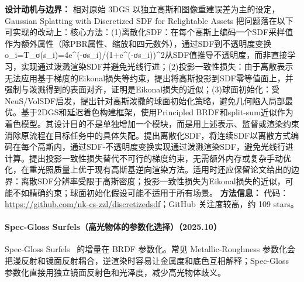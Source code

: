 \textbf{设计动机与边界：} 相对原始 3DGS 以独立高斯和图像重建误差为主的设定，Gaussian Splatting with Discretized SDF for Relightable Assets 把问题落在以下可实现的改动上：核心方法：(1)离散化SDF：在每个高斯上编码一个SDF采样值作为额外属性（除PBR属性、缩放和四元数外），通过SDF到不透明度变换o\_i=T\_σ(s\_i)=4e\^{}(-σs\_i)/(1+e\^{}(-σs\_i))\^{}2从SDF值推导不透明度，而非直接学习，实现通过泼溅渲染SDF并避免光线行进；(2)投影一致性损失：由于离散表示无法应用基于梯度的Eikonal损失等约束，提出将高斯投影到SDF零等值面上，并强制与泼溅得到的表面对齐，证明是Eikonal损失的近似；(3)球面初始化：受NeuS/VolSDF启发，提出针对高斯泼撒的球面初始化策略，避免几何陷入局部最优。基于2DGS和延迟着色构建框架，使用Principled BRDF和split-sum近似作为着色模型。其设计目的不是单独增加一个模块，而是用上述表示、监督或渲染约束消除原流程在目标任务中的具体失配。提出离散化SDF，将连续SDF以离散方式编码在每个高斯内，通过SDF-不透明度变换实现通过泼溅渲染SDF，避免光线行进计算。提出投影一致性损失替代不可行的梯度约束，无需额外内存或复杂手动优化，在重光照质量上优于现有高斯基逆向渲染方法。适用时还应保留论文给出的边界：离散SDF分辨率受限于高斯密度；投影一致性损失为Eikonal损失的近似，可能不如精确约束；球面初始化假设可能不适用于所有场景。
\textbf{方法信息：} 代码：\url{https://github.com/nk-cs-zzl/discretizedsdf}；GitHub 关注度较高，约 109 stars。



\paragraph{Spec-Gloss Surfels（高光物体的参数化选择）（2025.10）}
Spec-Gloss Surfels~\cite{2510_02069} 的增量在 BRDF 参数化。常见 Metallic-Roughness 参数化会把漫反射和镜面反射耦合，逆渲染时容易让金属度和底色互相解释；Spec-Gloss 参数化直接用独立镜面反射色和光泽度，减少高光物体歧义。

